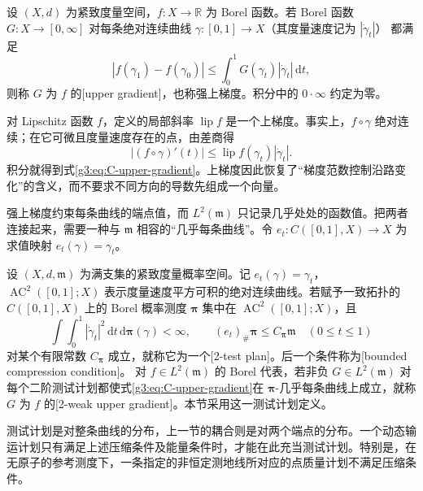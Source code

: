 \begin{definition}\label{g3:def:C-upper-gradient}
	设 \((X,d)\) 为紧致度量空间，\(f:X\to\mathbb R\) 为 Borel 函数。若 Borel 函数 \(G:X\to[0,\infty]\) 对每条绝对连续曲线 \(\gamma:[0,1]\to X\)（其度量速度记为 \(|\dot\gamma_t|\)） 都满足
	\begin{equation}\label{g3:eq:C-upper-gradient}
		|f(\gamma_1)-f(\gamma_0)|
		\le\int_0^1G(\gamma_t)|\dot\gamma_t|\,\mathrm dt,
	\end{equation}
	则称 \(G\) 为 \(f\) 的[upper gradient]，也称强上梯度。积分中的 \(0\cdot\infty\) 约定为零。
\end{definition}

对 Lipschitz 函数 \(f\)，定义的局部斜率 \(\operatorname{lip}f\) 是一个上梯度。事实上，\(f\circ\gamma\) 绝对连续；在它可微且度量速度存在的点，由差商得
\[
	|(f\circ\gamma)'(t)|
	\le\operatorname{lip}f(\gamma_t)|\dot\gamma_t|.
\]
积分就得到式\eqref{g3:eq:C-upper-gradient}。上梯度因此恢复了“梯度范数控制沿路变化”的含义，而不要求不同方向的导数先组成一个向量。

\ProseParagraphBreak
强上梯度约束每条曲线的端点值，而 \(L^2(\mathfrak m)\) 只记录几乎处处的函数值。把两者连接起来，需要一种与 \(\mathfrak m\) 相容的“几乎每条曲线”。令 \(e_t:C([0,1],X)\to X\) 为求值映射 \(e_t(\gamma)=\gamma_t\)。

\begin{definition}\label{g3:def:C-test-plan-weak-gradient}
	设 \((X,d,\mathfrak m)\) 为满支集的紧致度量概率空间。记 \(e_t(\gamma)=\gamma_t\)，\(\operatorname{AC}^2([0,1];X)\) 表示度量速度平方可积的绝对连续曲线。若赋予一致拓扑的 \(C([0,1],X)\) 上的 Borel 概率测度 \(\boldsymbol\pi\) 集中在 \(\operatorname{AC}^2([0,1];X)\)，且
	\[
		\int\!\int_0^1|\dot\gamma_t|^2\,\mathrm dt\,\mathrm d\boldsymbol\pi(\gamma)<\infty,
		\qquad (e_t)_\#\boldsymbol\pi\le C_{\boldsymbol\pi}\mathfrak m
		\quad(0\le t\le1)
	\]
	对某个有限常数 \(C_{\boldsymbol\pi}\) 成立，就称它为一个[2-test plan]。后一个条件称为[bounded compression condition]。
	\ProseParagraphBreak
	对 \(f\in L^2(\mathfrak m)\) 的 Borel 代表，若非负 \(G\in L^2(\mathfrak m)\) 对每个二阶测试计划都使式\eqref{g3:eq:C-upper-gradient}在 \(\boldsymbol\pi\)-几乎每条曲线上成立，就称 \(G\) 为 \(f\) 的[2-weak upper gradient]。本节采用这一测试计划定义。
\end{definition}

测试计划是对整条曲线的分布，上一节的耦合则是对两个端点的分布。一个动态输运计划只有满足上述压缩条件及能量条件时，才能在此充当测试计划。特别是，在无原子的参考测度下，一条指定的非恒定测地线所对应的点质量计划不满足压缩条件。


